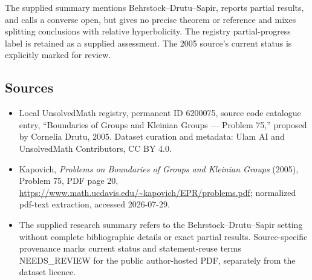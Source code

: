 \documentclass[11pt]{article}
\begin{document}
The supplied summary mentions Behrstock--Drutu--Sapir, reports partial results, and calls a converse open, but gives no precise theorem or reference and mixes splitting conclusions with relative hyperbolicity. The registry partial-progress label is retained as a supplied assessment. The 2005 source's current status is explicitly marked for review.
\subsection{Sources}
\begin{itemize}
\item Local UnsolvedMath registry, permanent ID 6200075, source code catalogue entry, ``Boundaries of Groups and Kleinian Groups --- Problem 75,'' proposed by Cornelia Drutu, 2005. Dataset curation and metadata: Ulam AI and UnsolvedMath Contributors, CC BY 4.0.
\item Kapovich, \emph{Problems on Boundaries of Groups and Kleinian Groups} (2005), Problem 75, PDF page 20, \url{https://www.math.ucdavis.edu/~kapovich/EPR/problems.pdf}; normalized pdf-text extraction, accessed 2026-07-29.
\item The supplied research summary refers to the Behrstock--Drutu--Sapir setting without complete bibliographic details or exact partial results. Source-specific provenance marks current status and statement-reuse terms NEEDS\_REVIEW for the public author-hosted PDF, separately from the dataset licence.
\end{itemize}
\end{document}
